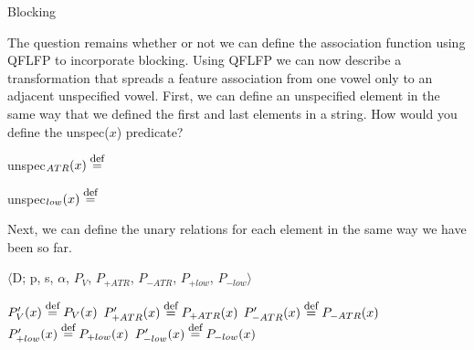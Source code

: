 \documentclass[,doc,floatsintext]{apa6}
\def\defeq{\mathrel{\buildrel \mbox{\footnotesize def} \over =}}
\theoremstyle{definition}
\theoremstyle{definition}
\theoremstyle{definition}
\theoremstyle{remark}
\begin{document}
\begin{exe}
  \ex \label{totalfunc.block} Blocking\\
\end{exe}

\noindent The question remains whether or not we can define the
association function using QFLFP to incorporate blocking. Using QFLFP we
can now describe a transformation that spreads a feature association
from one vowel only to an adjacent unspecified vowel. First, we can
define an unspecified element in the same way that we defined the first
and last elements in a string. How would you define the unspec(\(x\))
predicate?

unspec\(_{ATR}(x) \defeq\) \vspace{0.5in}

unspec\(_{low}(x) \defeq\) \vspace{0.5in}

\noindent Next, we can define the unary relations for each element in
the same way we have been so far.

\begin{exe}
\ex\label{function.block} $\langle$D; p, s, $\alpha$, $P_V$, $P_{+ATR}$, $P_{-ATR}$, $P_{+low}$, $P_{-low}\rangle$ 
\end{exe}

\noindent \(P'_{V}(x) \defeq P_{V}(x)\)\newline
\(P'_{+ATR}(x) \defeq P_{+ATR}(x)\) \hspace{0.5in}
\(P'_{-ATR}(x) \defeq P_{-ATR}(x)\)\newline
\(P'_{+low}(x) \defeq P_{+low}(x)\) \hspace{0.5in}
\(P'_{-low}(x) \defeq P_{-low}(x)\)\newline
\end{document}
